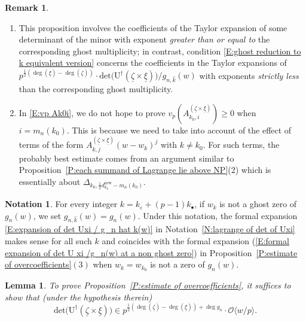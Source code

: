 \documentclass[12pt]{amsart}
\newtheorem{lemma}[subsection]{Lemma}
\theoremstyle{definition}
\newtheorem{remark}[subsection]{Remark}
\newtheorem{notation}[subsection]{Notation}
\numberwithin{equation}{subsection}
\def\calO{\mathcal{O}}
\def\rmU{\mathrm{U}}
\newcommand{\new}{\mathrm{new}}
\renewcommand{\det}{\mathrm{det}}
\begin{document}
\begin{remark}
\label{R:cannot have Delta}
\begin{enumerate}
    \item 
This proposition involves the coefficients of the Taylor expansion of some determinant of the minor with exponent \emph{greater than or equal to} the corresponding ghost multiplicity; in contrast, condition \eqref{E:ghost reduction to k equivalent version} concerns the coefficients in the Taylor expansions of $p^{\frac 12(\deg(\underline \xi)-\deg(\underline \zeta))}\cdot\det\big(\rmU^\dagger(\underline \zeta \times \underline \xi)\big) / g_{n,\hat k}(w)$ with exponents \emph{strictly less} than the corresponding ghost multiplicity. 
\item In \eqref{E:vp Ak0i}, we do not hope to prove $v_p(A_{k_0,i}^{(\underline \zeta \times \underline \xi)}) \geq 0$ when $i=m_n(k_0)$. This is because we need to take into account of the effect of terms of the form $A_{k,j}^{(\underline \zeta \times \underline \xi)}(w-w_k)^j$ with $k\neq k_0$. For such terms, the probably best estimate comes from an argument similar to Proposition~\ref{P:each summand of Lagrange lie above NP}(2) which is essentially about $\Delta_{k_0, \frac 12 d_{k_0}^\new - m_n(k_0)}$.
\end{enumerate}
\end{remark}
\begin{notation}\label{N:treat ghost zero and non ghost zero uniformly}
For every integer $k =  k_\varepsilon + (p-1)k_{\bullet}$, if $w_k$ is not a ghost zero of $g_n(w)$, we set $g_{n,\hat{ k}}(w)=g_n(w)$. Under this notation, the formal expansion \eqref{E:expansion of det Uxi / g_n hat k(w)} in Notation~\ref{N:lagrange of det of Uxi} makes sense for all such $k$ and coincides with the formal expansion (\ref{E:formal expansion of det U xi /g_n(w) at a non ghost zero}) in Proposition~\ref{P:estimate of overcoefficients}$(3)$ when $w_k=w_{k_0}$ is not a zero of $g_n(w)$. 
\end{notation}


\begin{lemma}\label{L:estimate of h xi implies estimate of overcoefficents}
To prove Proposition~\ref{P:estimate of overcoefficients}, it suffices to show that (under the hypothesis therein)
\begin{equation}
	\label{E:estimate on det Uzetaxi}
	\det\big(\rmU^{\dagger}(\underline \zeta \times \underline \xi)\big) \in p^{\frac 12(\deg(\underline \zeta)-\deg(\underline \xi))+ \deg g_n} \cdot \calO\langle w/p\rangle.
\end{equation}
\end{lemma}
\end{document}
